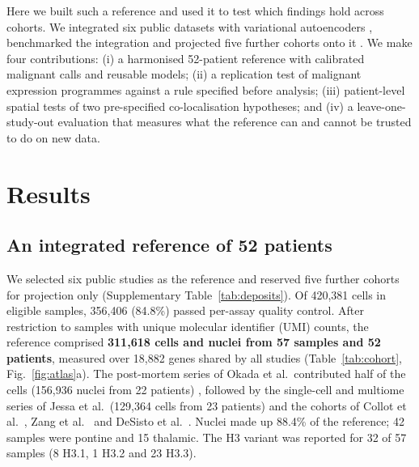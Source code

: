 \documentclass[11pt,a4paper]{article}
\begin{document}
Here we built such a reference and used it to test which findings hold across cohorts. We integrated six public
datasets with variational autoencoders \citep{lopez2018deep,xu2021probabilistic}, benchmarked the integration
\citep{luecken2021benchmarking} and projected five further cohorts onto it \citep{lotfollahi2021mapping}. We make four
contributions: (i) a harmonised 52-patient reference with calibrated malignant calls and reusable models; (ii) a
replication test of malignant expression programmes against a rule specified before analysis; (iii) patient-level
spatial tests of two pre-specified co-localisation hypotheses; and (iv) a leave-one-study-out evaluation that measures
what the reference can and cannot be trusted to do on new data.

\section{Results}

\subsection{An integrated reference of 52 patients}

We selected six public studies as the reference and reserved five further cohorts for projection only (Supplementary
Table~\ref{tab:deposits}). Of 420,381 cells in eligible samples, 356,406 (84.8\%) passed per-assay quality control. After
restriction to samples with unique molecular identifier (UMI) counts, the reference comprised \textbf{311,618 cells and
nuclei from 57 samples and 52 patients}, measured over 18,882 genes shared by all studies (Table~\ref{tab:cohort},
Fig.~\ref{fig:atlas}a). The post-mortem series of Okada et al.\ contributed half of the cells (156,936 nuclei from 22
patients) \citep{okada2026singlenucleus}, followed by the single-cell and multiome series of Jessa et al.\ (129,364 cells
from 23 patients) \citep{jessa2022km} and the cohorts of Collot et al.\ \citep{collot2026igsfvista}, Zang et al.\
\citep{zang2024singlecell} and DeSisto et al.\ \citep{desisto2024tumor}. Nuclei made up 88.4\% of the reference; 42 samples
were pontine and 15 thalamic. The H3 variant was reported for 32 of 57 samples (8 H3.1, 1 H3.2 and 23 H3.3).
\end{document}
